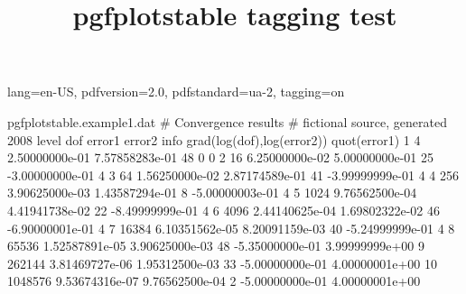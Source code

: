 \DocumentMetadata
  {
    lang=en-US,
    pdfversion=2.0,
    pdfstandard=ua-2,
    tagging=on
  }
\begin{filecontents*}{pgfplotstable.example1.dat}
# Convergence results
# fictional source, generated 2008
level dof error1 error2 info grad(log(dof),log(error2)) quot(error1)
1 4 2.50000000e-01 7.57858283e-01 48 0 0
2 16 6.25000000e-02 5.00000000e-01 25 -3.00000000e-01 4
3 64 1.56250000e-02 2.87174589e-01 41 -3.99999999e-01 4
4 256 3.90625000e-03 1.43587294e-01 8 -5.00000003e-01 4
5 1024 9.76562500e-04 4.41941738e-02 22 -8.49999999e-01 4
6 4096 2.44140625e-04 1.69802322e-02 46 -6.90000001e-01 4
7 16384 6.10351562e-05 8.20091159e-03 40 -5.24999999e-01 4
8 65536 1.52587891e-05 3.90625000e-03 48 -5.35000000e-01 3.99999999e+00
9 262144 3.81469727e-06 1.95312500e-03 33 -5.00000000e-01 4.00000001e+00
10 1048576 9.53674316e-07 9.76562500e-04 2 -5.00000000e-01 4.00000001e+00
\end{filecontents*}

\documentclass{article}
\usepackage{pgfplotstable,booktabs}
\pgfplotsset{compat=newest}

\title{pgfplotstable tagging test}




\bigskip

         

